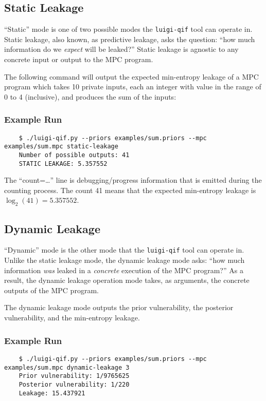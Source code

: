 \documentclass[11pt]{article}
\begin{document}
\subsection{Static Leakage}
\label{static}
``Static'' mode is one of two possible modes the \texttt{luigi-qif} tool can operate in. Static leakage, also known, as predictive leakage, asks the question: ``how much information do we \emph{expect} will be leaked?'' Static leakage is agnostic to any concrete input or output to the MPC program.

The following command will output the expected min-entropy leakage of a MPC program which takes 10 private inputs, each an integer with value in the range of 0 to 4 (inclusive), and produces the sum of the inputs:

\subsubsection*{Example Run}
\begin{verbatim}
    $ ./luigi-qif.py --priors examples/sum.priors --mpc examples/sum.mpc static-leakage
    Number of possible outputs: 41
    STATIC LEAKAGE: 5.357552
\end{verbatim}

The ``count=\ldots'' line is debugging/progress information that is emitted during the counting process. The count 41 means that the expected min-entropy leakage is $\log_2(41) = 5.357552$.

\subsection{Dynamic Leakage}
\label{dynamic}
``Dynamic'' mode is the other mode that the \texttt{luigi-qif} tool can operate in. Unlike the static leakage mode, the dynamic leakage mode asks: ``how much information \emph{was} leaked in a \emph{concrete} execution of the MPC program?'' As a result, the dynamic leakage operation mode takes, as arguments, the concrete outputs of the MPC program.

The dynamic leakage mode outputs the prior vulnerability, the posterior vulnerability, and the min-entropy leakage.

\subsubsection*{Example Run}
\begin{verbatim}
    $ ./luigi-qif.py --priors examples/sum.priors --mpc examples/sum.mpc dynamic-leakage 3
    Prior vulnerability: 1/9765625
    Posterior vulnerability: 1/220
    Leakage: 15.437921
\end{verbatim}
\end{document}
